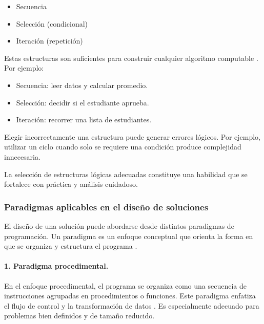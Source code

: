 \documentclass[12pt,twoside]{book}
\begin{document}
						\begin{itemize}
							\item Secuencia
							\item Selección (condicional)
							\item Iteración (repetición)
						\end{itemize}
						
						\noindent
						Estas estructuras son suficientes para construir cualquier algoritmo computable \cite{Cormen2022Introduction,Sedgewick2011Algorithms}. Por ejemplo:
						
						\begin{itemize}
							\item Secuencia: leer datos y calcular promedio.
							\item Selección: decidir si el estudiante aprueba.
							\item Iteración: recorrer una lista de estudiantes.
						\end{itemize}
						\noindent
						Elegir incorrectamente una estructura puede generar errores lógicos. Por ejemplo, utilizar un ciclo cuando solo se requiere una condición produce complejidad innecesaria.
						
						La selección de estructuras lógicas adecuadas constituye una habilidad que se fortalece con práctica y análisis cuidadoso.
						
					\subsubsection{Paradigmas aplicables en el diseño de soluciones}
						\noindent
						El diseño de una solución puede abordarse desde distintos paradigmas de programación. Un paradigma es un enfoque conceptual que orienta la forma en que se organiza y estructura el programa \cite{Sebesta2018Concepts}.
						
						\paragraph{1. Paradigma procedimental.} En el enfoque procedimental, el programa se organiza como una secuencia de instrucciones agrupadas en procedimientos o funciones. Este paradigma enfatiza el flujo de control y la transformación de datos \cite{Kernighan1988C}. Es especialmente adecuado para problemas bien definidos y de tamaño reducido.
						
\end{document}
